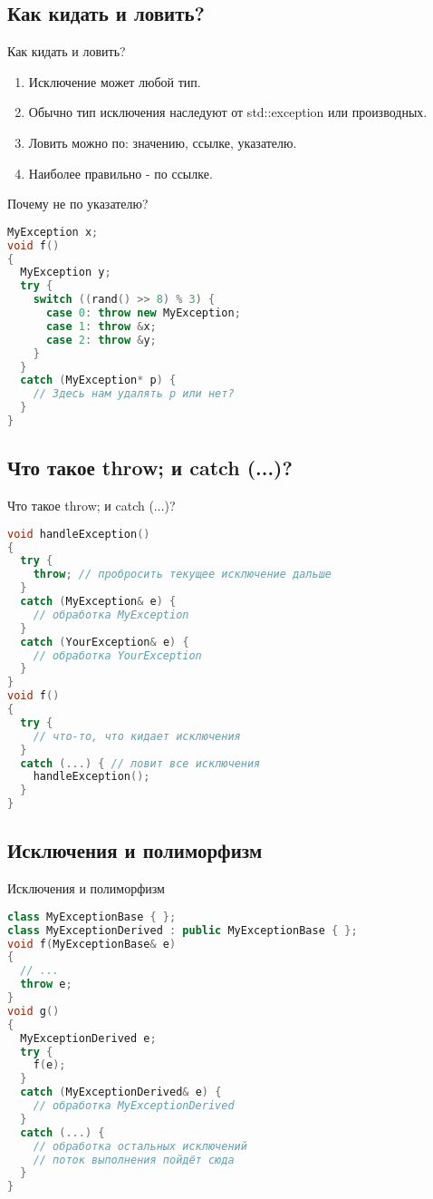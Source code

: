 \documentclass[10pt]{beamer}
\begin{document}
\subsection{Как кидать и ловить?}
\begin{frame}[fragile]{Как кидать и ловить?}
\begin{enumerate}
    \item Исключение может любой тип.
    \item Обычно тип исключения наследуют от std::exception или производных.
    \item Ловить можно по: значению, ссылке, указателю.
    \item Наиболее правильно - по ссылке.
\end{enumerate}
\end{frame}

\begin{frame}[fragile]{Почему не по указателю?}
\begin{lstlisting}[language=C++]
MyException x;
void f()
{
  MyException y;
  try {
    switch ((rand() >> 8) % 3) {
      case 0: throw new MyException;
      case 1: throw &x;
      case 2: throw &y;
    }
  }
  catch (MyException* p) {
    // Здесь нам удалять p или нет?
  }
}
\end{lstlisting}
\end{frame}

\subsection{Что такое throw; и catch (...)?}
\begin{frame}[fragile]{Что такое throw; и catch (...)?}
\begin{lstlisting}[language=C++]
void handleException()
{
  try {
    throw; // пробросить текущее исключение дальше
  }
  catch (MyException& e) {
    // обработка MyException
  }
  catch (YourException& e) {
    // обработка YourException
  }
}
void f()
{
  try {
    // что-то, что кидает исключения
  }
  catch (...) { // ловит все исключения
    handleException();
  }
}
\end{lstlisting}
\end{frame}


\subsection{Исключения и полиморфизм}
\begin{frame}[fragile]{Исключения и полиморфизм}
\begin{lstlisting}[language=C++]
class MyExceptionBase { };
class MyExceptionDerived : public MyExceptionBase { };
void f(MyExceptionBase& e)
{
  // ...
  throw e;
}
void g()
{
  MyExceptionDerived e;
  try {
    f(e);
  }
  catch (MyExceptionDerived& e) {
    // обработка MyExceptionDerived
  }
  catch (...) {
    // обработка остальных исключений
    // поток выполнения пойдёт сюда
  }
}
\end{lstlisting}
\end{frame}
\end{document}
